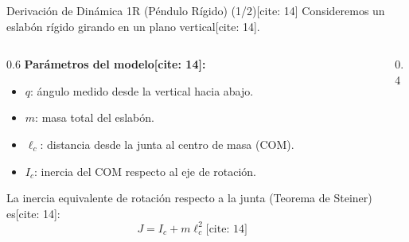 \documentclass[aspectratio=169, xcolor={table,xcdraw}]{beamer}
\begin{document}
\begin{frame}{Derivación de Dinámica 1R (Péndulo Rígido) (1/2)[cite: 14]}
    Consideremos un eslabón rígido girando en un plano vertical[cite: 14].
    \begin{columns}[T]
        \begin{column}{0.6\textwidth}
            \textbf{Parámetros del modelo[cite: 14]:}
            \begin{itemize}
                \item $q$: ángulo medido desde la vertical hacia abajo.
                \item $m$: masa total del eslabón.
                \item $\ell_c$: distancia desde la junta al centro de masa (COM).
                \item $I_c$: inercia del COM respecto al eje de rotación.
            \end{itemize}
            
            La inercia equivalente de rotación respecto a la junta (Teorema de Steiner) es[cite: 14]:
            \begin{equation*}
                J = I_c + m\ell_c^2 \text{[cite: 14]}
            \end{equation*}
        \end{column}
        \begin{column}{0.4\textwidth}
            \centering
        \end{column}
    \end{columns}
\end{frame}
\end{document}
